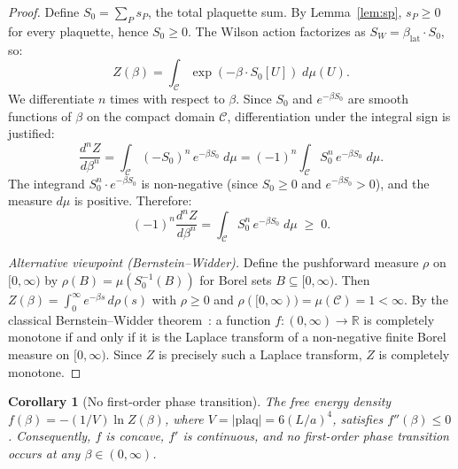 \documentclass[12pt,a4paper]{article}
\theoremstyle{plain}
\newtheorem{corollary}[theorem]{Corollary}
\theoremstyle{definition}
\theoremstyle{remark}
\begin{document}
\begin{proof}
Define $S_0 = \sum_{P} s_P$, the total plaquette sum. By Lemma~\ref{lem:sp}, $s_P\geq 0$ for every plaquette, hence $S_0\geq 0$. The Wilson action factorizes as $S_W=\beta_{\mathrm{lat}}\cdot S_0$, so:
\begin{equation}\label{eq:Zlaplace}
Z(\beta) = \int_{\mathcal{C}} \exp(-\beta\cdot S_0[U])\;d\mu(U).
\end{equation}
We differentiate $n$ times with respect to $\beta$. Since $S_0$ and $e^{-\beta S_0}$ are smooth functions of $\beta$ on the compact domain $\mathcal{C}$, differentiation under the integral sign is justified:
\begin{equation}\label{eq:cmderiv}
\frac{d^n Z}{d\beta^n} = \int_{\mathcal{C}} (-S_0)^n\,e^{-\beta S_0}\;d\mu = (-1)^n\int_{\mathcal{C}} S_0^n\,e^{-\beta S_0}\;d\mu.
\end{equation}
The integrand $S_0^n\cdot e^{-\beta S_0}$ is non-negative (since $S_0\geq 0$ and $e^{-\beta S_0}>0$), and the measure $d\mu$ is positive. Therefore:
\begin{equation}
(-1)^n\frac{d^n Z}{d\beta^n} = \int_{\mathcal{C}} S_0^n\,e^{-\beta S_0}\;d\mu \;\geq\; 0.
\end{equation}

\textit{Alternative viewpoint (Bernstein--Widder).} Define the pushforward measure $\rho$ on $[0,\infty)$ by $\rho(B)=\mu(S_0^{-1}(B))$ for Borel sets $B\subseteq[0,\infty)$. Then $Z(\beta)=\int_0^\infty e^{-\beta s}\,d\rho(s)$ with $\rho\geq 0$ and $\rho([0,\infty))=\mu(\mathcal{C})=1<\infty$. By the classical Bernstein--Widder theorem~\cite{Bernstein1929,Widder1941}: a function $f:(0,\infty)\to\mathbb{R}$ is completely monotone if and only if it is the Laplace transform of a non-negative finite Borel measure on $[0,\infty)$. Since $Z$ is precisely such a Laplace transform, $Z$ is completely monotone.
\end{proof}

\begin{corollary}[No first-order phase transition]\label{cor:no1st}
The free energy density $f(\beta)=-(1/V)\ln Z(\beta)$, where $V=|\mathrm{plaq}|=6(L/a)^4$, satisfies $f''(\beta)\leq 0$. Consequently, $f$ is concave, $f'$ is continuous, and no first-order phase transition occurs at any $\beta\in(0,\infty)$.
\end{corollary}
\end{document}
